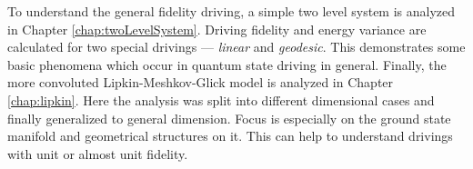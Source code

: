 To understand the general fidelity driving, a simple two level system is analyzed in Chapter \ref{chap:twoLevelSystem}. Driving fidelity and energy variance are calculated for two special drivings — \emph{linear} and \emph{geodesic}. This demonstrates some basic phenomena which occur in quantum state driving in general. Finally, the more convoluted Lipkin-Meshkov-Glick model is analyzed in Chapter \ref{chap:lipkin}. Here the analysis was split into different dimensional cases and finally generalized to general dimension. Focus is especially on the ground state manifold and geometrical structures on it. This can help to understand drivings with unit or almost unit fidelity.